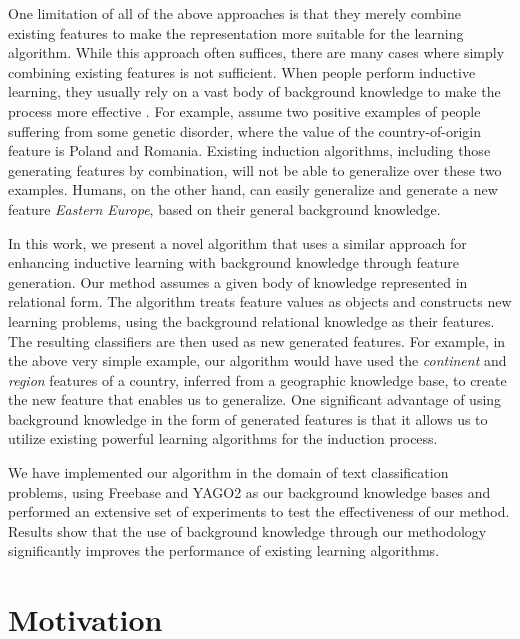 \documentclass{article}
\theoremstyle{definition}
\begin{document}
One limitation of all of the above approaches is that they merely combine existing features to make the representation more suitable for the 
learning algorithm.   While this approach often suffices, there are many cases where simply combining existing features is not sufficient.
When people perform inductive learning, they usually rely on a vast body of background knowledge to make the process more
effective \citep{mcnamara1996learning}. For example, assume two positive examples of people suffering from some genetic disorder, where the 
value of the country-of-origin feature is Poland and Romania.  Existing induction algorithms, including those generating features 
by combination, will not be able to generalize over these two examples.  Humans, on the other hand, can easily generalize 
and generate a new feature \emph{Eastern Europe}, based
on their general background knowledge.

In this work, we present a novel algorithm that uses a similar approach for enhancing inductive learning with background knowledge through feature generation.
Our method assumes a given body of knowledge represented in relational form.  The algorithm treats feature values as objects and constructs new learning problems, using the background relational knowledge as their features.  The resulting classifiers are then used as new generated features.
For example, in the above very simple example, our algorithm would have used the \emph{continent} and \emph{region} features of a country,
inferred from a geographic knowledge base, to create the new feature that enables us to generalize.  One significant advantage of
using background knowledge in the form of generated features is that it allows us to utilize existing powerful learning algorithms for the induction process.

We have implemented our algorithm in the domain of text classification problems, using Freebase and YAGO2 as our background knowledge bases 
and performed an extensive set of experiments to test the effectiveness of our method.  Results show that the use of background knowledge through our methodology significantly improves the performance of existing learning algorithms.

\section{Motivation} \label{motivation}
\end{document}
